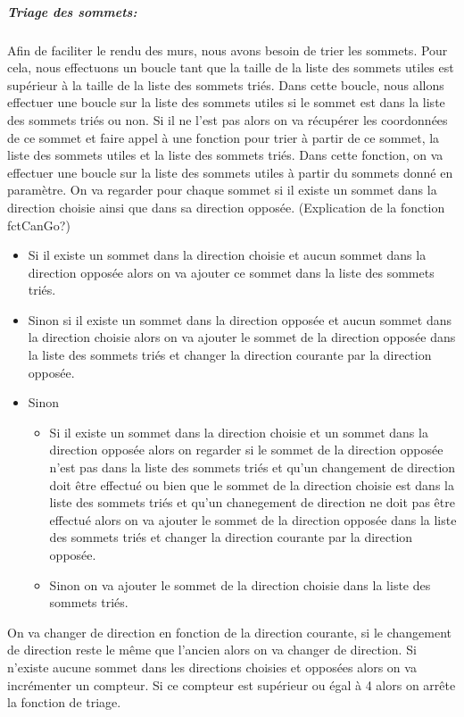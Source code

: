 \documentclass[12pt]{report}
\begin{document}
\subparagraph{Triage des sommets:}
Afin de faciliter le rendu des murs, nous avons besoin de trier les sommets.
Pour cela, nous effectuons un boucle tant que la taille de la liste des 
sommets utiles est supérieur à la taille de la liste des sommets triés.
Dans cette boucle, nous allons effectuer une boucle sur la liste des sommets
utiles si le sommet est dans la liste des sommets triés ou non. Si il ne l'est
pas alors on va récupérer les coordonnées de ce sommet et faire appel à une fonction
pour trier à partir de ce sommet, la liste des sommets utiles et la liste des sommets
triés.
Dans cette fonction, on va effectuer une boucle sur la liste des sommets utiles
à partir du sommets donné en paramètre. On va regarder pour chaque sommet si il
existe un sommet dans la direction choisie ainsi que dans sa direction opposée.
(Explication de la fonction fctCanGo?)
\begin{itemize}
	\item Si il existe un sommet dans la direction choisie et aucun sommet dans
	la direction opposée alors on va ajouter ce sommet dans la liste des sommets
	triés.
	\item Sinon si il existe un sommet dans la direction opposée et aucun sommet
	dans la direction choisie alors on va ajouter le sommet de la direction opposée
	dans la liste des sommets triés et changer la direction courante par la 
	direction opposée.
	\item Sinon 
	\begin{itemize}
		\item Si il existe un sommet dans la direction choisie et un sommet 
		dans la direction opposée alors on regarder si le sommet de la 
		direction opposée n'est pas dans la liste des sommets triés et qu'un
		changement de direction doit être effectué ou bien que le sommet de 
		la direction choisie est dans la liste des sommets triés et qu'un 
		chanegement de direction ne doit pas être effectué alors on va ajouter
		le sommet de la direction opposée dans la liste des sommets triés
		et changer la direction courante par la direction opposée.
		\item Sinon on va ajouter le sommet de la direction choisie dans la liste 
		des sommets triés.
	\end{itemize}	
\end{itemize}
On va changer de direction en fonction de la direction courante, si le changement
de direction reste le même que l'ancien alors on va changer de direction.
Si n'existe aucune sommet dans les directions choisies et opposées alors on
va incrémenter un compteur. Si ce compteur est supérieur ou égal à 4 alors 
on arrête la fonction de triage.
\end{document}
